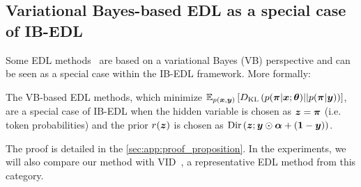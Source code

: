 \subsection{Variational Bayes-based EDL as a special case of IB-EDL}
Some EDL methods~\citep{chen2018variational, joo2020being} are based on a variational Bayes (VB) perspective
and can be seen as a special case within the IB-EDL framework. 
More formally:

\begin{proposition} 
The VB-based EDL methods, which minimize $\mathbb{E}_{p(\bm{x}, \bm{y})}\left[D_{\text{KL}}\left(p(\bm{\pi} | \bm{x} ; \bm{\theta}) || p(\bm{\pi} | \bm{y}) \right) \right]$, are a special case of IB-EDL when the hidden variable is chosen as $\bm{z} = \bm{\pi}$ (i.e. token probabilities) and the prior $r(\bm{z})$ is chosen as $\text{Dir}\left( \bm{z}; \bm{y} \odot \bm{\alpha} + (\bm{1} - \bm{y}) \right)$. 
\label{prop:vb_as_ib_edl}
\end{proposition}

The proof is detailed in the \cref{sec:app:proof_proposition}. In the experiments, we will also compare our method with VID~\citep{chen2018variational}, a representative EDL method from this category.



